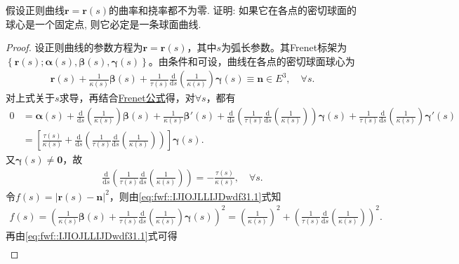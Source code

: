 \documentclass[../../main.tex]{subfiles}%
\begin{document}
\begin{example}
假设正则曲线$\bm{r} = \bm{r}(s)$的曲率和挠率都不为零. 证明: 如果它在各点的密切球面的球心是一个固定点, 则它必定是一条球面曲线.
\end{example}
\begin{proof}

设正则曲线的参数方程为$\bm{r}=\bm{r}(s)$，其中$s$为弧长参数。其Frenet标架为$\left\{ \bm{r}(s); \bm{\alpha}(s), \bm{\beta}(s), \bm{\gamma}(s) \right\}$。由条件和可设，曲线在各点的密切球面球心为
\begin{align}
\bm{r}(s) + \frac{1}{\kappa(s)}\bm{\beta}(s) + \frac{1}{\tau(s)}\frac{\mathrm{d}}{\mathrm{d}s}\left( \frac{1}{\kappa(s)} \right) \bm{\gamma}(s) \equiv \bm{n}\in E^3,\quad \forall s.
\label{eq:fwf::IJIOJLLIJDwdf31.1}
\end{align}
对上式关于$s$求导，再结合\hyperref[theorem:微分几何-Frenet公式]{Frenet公式}得，对$\forall s$，都有
\begin{align*}
0&=\bm{\alpha}(s) +\frac{\mathrm{d}}{\mathrm{d}s}\left( \frac{1}{\kappa(s)} \right) \bm{\beta}(s) +\frac{1}{\kappa(s)}\bm{\beta}'(s) +\frac{\mathrm{d}}{\mathrm{d}s}\left( \frac{1}{\tau(s)}\frac{\mathrm{d}}{\mathrm{d}s}\left( \frac{1}{\kappa(s)} \right) \right) \bm{\gamma}(s) +\frac{1}{\tau(s)}\frac{\mathrm{d}}{\mathrm{d}s}\left( \frac{1}{\kappa(s)} \right) \bm{\gamma}'(s) \\
&=\left[ \frac{\tau(s)}{\kappa(s)}+\frac{\mathrm{d}}{\mathrm{d}s}\left( \frac{1}{\tau(s)}\frac{\mathrm{d}}{\mathrm{d}s}\left( \frac{1}{\kappa(s)} \right) \right) \right] \bm{\gamma}(s).
\end{align*}
又$\bm{\gamma}(s) \ne \bm{0}$，故
\begin{align}
\frac{\mathrm{d}}{\mathrm{d}s}\left( \frac{1}{\tau(s)}\frac{\mathrm{d}}{\mathrm{d}s}\left( \frac{1}{\kappa(s)} \right) \right) =-\frac{\tau(s)}{\kappa(s)},\quad \forall s.
\label{eq:fwf::IJIOJLLIJDwdf31.2}
\end{align}
令$f(s)=\left| \bm{r}(s)-\bm{n} \right|^2$，则由\eqref{eq:fwf::IJIOJLLIJDwdf31.1}式知
\begin{align*}
f(s)=\left( \frac{1}{\kappa(s)}\bm{\beta}(s) +\frac{1}{\tau(s)}\frac{\mathrm{d}}{\mathrm{d}s}\left( \frac{1}{\kappa(s)} \right) \bm{\gamma}(s) \right) ^2=\left( \frac{1}{\kappa(s)} \right) ^2+\left( \frac{1}{\tau(s)}\frac{\mathrm{d}}{\mathrm{d}s}\left( \frac{1}{\kappa(s)} \right) \right) ^2.
\end{align*}
再由\eqref{eq:fwf::IJIOJLLIJDwdf31.1}式可得
\begin{align*}

\end{align*}
\end{proof}
\end{document}
